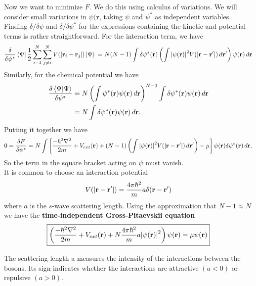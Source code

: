 \documentclass{book}
\theoremstyle{definition}
\newcommand{\f}[2]{\frac{#1}{#2}}
\newcommand{\lp}{\left(}
\newcommand{\rp}{\right)}
\newcommand{\lb}{\left[}
\newcommand{\rb}{\right]}
\begin{document}
Now we want to minimize $F$. We do this using calculus of variations. We will consider small variations in $\psi(\mathbf{r}$, taking $\psi$ and $\psi^*$ as independent variables. Finding $\delta/\delta \psi$ and $\delta/\delta \psi^*$ for the expressions containing the kinetic and potential terms is rather straightforward. For the interaction term, we have
\begin{equation*}
\f{\delta}{\delta \psi^*} \bra{\Psi} \f{1}{2}\sum^N_{i=1}\sum^N_{j\neq i} V(\abs{\mathbf{r}_i - \mathbf{r}_j}) \ket{\Psi} \\
= N(N-1) \int \delta \psi^*(\mathbf{r}) \lp \int \abs{\psi(\mathbf{r})}^2 V(\abs{\mathbf{r} - \mathbf{r}'}) \,d\mathbf{r}' \rp \psi(\mathbf{r})\,d\mathbf{r}
\end{equation*}
Similarly, for the chemical potential we have
\begin{align*}
\f{\delta \braket{\Psi}}{\delta \psi^*}  &= N\lp \int \psi^*(\mathbf{r})\psi(\mathbf{r})\,d\mathbf{r} \rp^{N-1}\int \delta \psi^*(\mathbf{r}) \psi(\mathbf{r})\,d\mathbf{r} \\
&=  N\int \delta \psi^*(\mathbf{r}) \psi(\mathbf{r})\,d\mathbf{r}.
\end{align*}
Putting it together we have
\begin{equation*}
0=\f{\delta F}{\delta \psi^*} = N\int \lb  \f{-\hbar^2\nabla^2}{2m}  + V_{ext}(\mathbf{r})+ (N-1)\lp \int \abs{\psi(\mathbf{r})}^2V(\abs{\mathbf{r} - \mathbf{r}'})\,d\mathbf{r}' \rp  - \mu   \rb \psi(\mathbf{r}) \delta \psi^*(\mathbf{r})\,d\mathbf{r}.
\end{equation*}
So the term in the square bracket acting on $\psi$ must vanish. \\


It is common to choose an interaction potential
\begin{equation*}
V(\abs{\mathbf{r} - \mathbf{r}'}) = \f{4\pi \hbar^2}{m}a\delta(\mathbf{r} - \mathbf{r}')
\end{equation*}
where $a$ is the $s$-wave scattering length. Using the approximation that $N-1\approx N$ we have the \textbf{time-independent Gross-Pitaevskii equation}
\begin{equation*}
\boxed{\lp \f{-\hbar^2\nabla^2}{2m}  + V_{ext}(\mathbf{r})+ N \f{4\pi\hbar^2}{m}a\abs{\psi(\mathbf{r})}^2 \rp \psi(\mathbf{r})   = \mu \psi(\mathbf{r})}
\end{equation*}

The scattering length a
measures the intensity of the interactions between the bosons. Its sign indicates whether the interactions are attractive $(a < 0)$ or repulsive $(a > 0)$.
\end{document}
